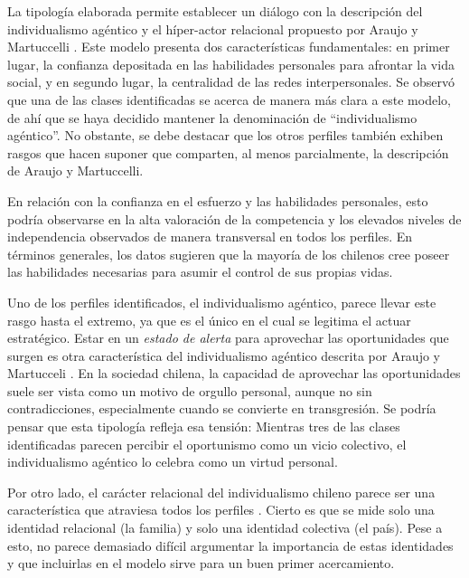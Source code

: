 \documentclass[12pt,twoside]{templates/facsothesis}
\begin{document}
La tipología elaborada permite establecer un diálogo con la descripción del individualismo agéntico y el híper-actor relacional propuesto por Araujo y Martuccelli \citeyearpar{araujo2020}. Este modelo presenta dos características fundamentales: en primer lugar, la confianza depositada en las habilidades personales para afrontar la vida social, y en segundo lugar, la centralidad de las redes interpersonales. Se observó que una de las clases identificadas se acerca de manera más clara a este modelo, de ahí que se haya decidido mantener la denominación de ``individualismo agéntico''. No obstante, se debe destacar que los otros perfiles también exhiben rasgos que hacen suponer que comparten, al menos parcialmente, la descripción de Araujo y Martuccelli.

En relación con la confianza en el esfuerzo y las habilidades personales, esto podría observarse en la alta valoración de la competencia y los elevados niveles de independencia observados de manera transversal en todos los perfiles. En términos generales, los datos sugieren que la mayoría de los chilenos cree poseer las habilidades necesarias para asumir el control de sus propias vidas.

Uno de los perfiles identificados, el individualismo agéntico, parece llevar este rasgo hasta el extremo, ya que es el único en el cual se legitima el actuar estratégico. Estar en un \emph{estado de alerta} para aprovechar las oportunidades que surgen es otra característica del individualismo agéntico descrita por Araujo y Martucceli \citeyearpar{araujo2014}. En la sociedad chilena, la capacidad de aprovechar las oportunidades suele ser vista como un motivo de orgullo personal, aunque no sin contradicciones, especialmente cuando se convierte en transgresión. Se podría pensar que esta tipología refleja esa tensión: Mientras tres de las clases identificadas parecen percibir el oportunismo como un vicio colectivo, el individualismo agéntico lo celebra como un virtud personal.

Por otro lado, el carácter relacional del individualismo chileno parece ser una característica que atraviesa todos los perfiles \citep{araujo2014}. Cierto es que se mide solo una identidad relacional (la familia) y solo una identidad colectiva (el país). Pese a esto, no parece demasiado difícil argumentar la importancia de estas identidades y que incluirlas en el modelo sirve para un buen primer acercamiento.
\end{document}
